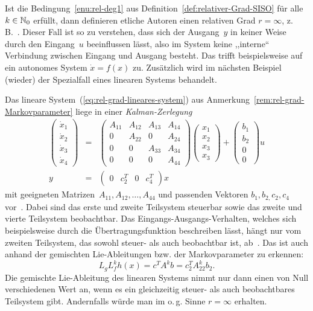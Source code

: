 Ist die Bedingung~\ref{enu:rel-deg1} aus Definition~\ref{def:relativer-Grad-SISO}
für alle $k\in{\mathbb{N}_0}$ erfüllt, dann definieren etliche Autoren einen
relativen Grad $r=\infty$, z.\,B.~\cite[Def.~{6.177}]{kwatny2000}.
Dieser Fall ist so zu verstehen, dass sich der Ausgang~$y$ in keiner
Weise durch den Eingang~$u$ beeinflussen lässt, also im System keine
,,interne`` Verbindung zwischen Eingang und Ausgang besteht. Das
trifft beispielsweise auf ein autonomes System $\dot{x}=f(x)$ zu.
Zusätzlich wird im nächsten Beispiel (wieder) der Spezialfall eines
linearen Systems behandelt. 
\begin{example}
\label{exa:Lineares-System-r-infty}Das lineare System~(\ref{eq:rel-grad-lineares-system})
aus Anmerkung~\ref{rem:rel-grad-Markovparameter} liege in einer
\emph{Kalman-Zerlegung} 
\begin{eqnarray*}
\left(\begin{array}{c}
\dot{x}_{1}\\
\dot{x}_{2}\\
\dot{x}_{3}\\
\dot{x}_{4}
\end{array}\right) & = & \left(\begin{array}{cccc}
A_{11} & A_{12} & A_{13} & A_{14}\\
0 & A_{22} & 0 & A_{24}\\
0 & 0 & A_{33} & A_{34}\\
0 & 0 & 0 & A_{44}
\end{array}\right)\left(\begin{array}{c}
x_{1}\\
x_{2}\\
x_{3}\\
x_{3}
\end{array}\right)+\left(\begin{array}{c}
b_{1}\\
b_{2}\\
0\\
0
\end{array}\right)u\\
y & = & \left(\begin{array}{cccc}
0 & c_{2}^{T} & 0 & c_{4}^{T}\end{array}\right)x
\end{eqnarray*}
mit geeigneten Matrizen~$A_{11},A_{12},\ldots,A_{44}$ und passenden
Vektoren $b_{1},b_{2,}c_{2},c_{4}$ vor~\cite{lunze-rt2}. Dabei
sind das erste und zweite Teilsystem steuerbar sowie das zweite und
vierte Teilsystem beobachtbar. Das Eingangs-Ausgangs-Verhalten, welches
sich beispielsweise durch die Übertragungsfunktion beschreiben lässt,
hängt nur vom zweiten Teilsystem, das sowohl steuer- als auch beobachtbar
ist, ab~\cite{kalman1962canonical,lunze-rt2}. Das ist auch anhand
der gemischten Lie-Ableitungen bzw. der Markovparameter
zu erkennen: 
\[
L_{g}L_{f}^{k}h(x)=c^{T}A^{k}b=c_{2}^{T}A_{22}^{k}b_{2}.
\]
Die gemischte Lie-Ableitung des linearen Systems nimmt nur dann einen
von Null verschiedenen Wert an, wenn es ein gleichzeitig steuer- als
auch beobachtbares Teilsystem gibt. Andernfalls würde man im o.\,g.
Sinne $r=\infty$ erhalten.

\end{example}
\medskip{}

